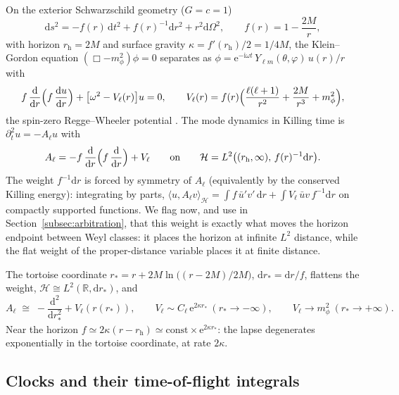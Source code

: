 \documentclass[11pt]{article}
\theoremstyle{definition}
\theoremstyle{remark}
\newcommand{\ii}{\mathrm{i}}
\newcommand{\ee}{\mathrm{e}}
\newcommand{\dd}{\mathrm{d}}
\newcommand{\rh}{r_{\mathrm{h}}}
\newcommand{\rstar}{r_{*}}
\begin{document}
On the exterior Schwarzschild geometry ($G=c=1$)
\begin{equation}
\dd s^{2}=-f(r)\,\dd t^{2}+f(r)^{-1}\dd r^{2}+r^{2}\dd\Omega^{2},
\qquad f(r)=1-\frac{2M}{r},
\end{equation}
with horizon $\rh=2M$ and surface gravity
$\kappa=f'(\rh)/2=1/4M$, the Klein--Gordon equation
$(\Box-m_{\phi}^{2})\phi=0$ separates as
$\phi=\ee^{-\ii\omega t}\,Y_{\ell m}(\theta,\varphi)\,u(r)/r$ with
\begin{equation}
f\,\frac{\dd}{\dd r}\Bigl(f\,\frac{\dd u}{\dd r}\Bigr)
+\bigl[\omega^{2}-V_{\ell}(r)\bigr]u=0,
\qquad
V_{\ell}(r)=f(r)\Bigl(\frac{\ell(\ell+1)}{r^{2}}
+\frac{2M}{r^{3}}+m_{\phi}^{2}\Bigr),
\label{eq:radial}
\end{equation}
the spin-zero Regge--Wheeler potential \cite{ReggeWheeler1957}. The
mode dynamics in Killing time is $\partial_{t}^{2}u=-A_{\ell}u$ with
\begin{equation}
A_{\ell}=-f\,\frac{\dd}{\dd r}\Bigl(f\,\frac{\dd}{\dd r}\Bigr)
+V_{\ell}
\qquad\text{on}\qquad
\mathcal{H}=L^{2}\bigl((\rh,\infty),\,f(r)^{-1}\dd r\bigr).
\label{eq:Aell}
\end{equation}
The weight $f^{-1}\dd r$ is forced by symmetry of $A_{\ell}$ (equivalently
by the conserved Killing energy): integrating by parts,
$\langle u,A_{\ell}v\rangle_{\mathcal H}
=\int f\,\bar u' v'\,\dd r+\int V_{\ell}\,\bar u v\,f^{-1}\dd r$
on compactly supported functions. We flag now, and use in
Section~\ref{subsec:arbitration}, that this weight is exactly what
moves the horizon endpoint between Weyl classes: it places the horizon
at infinite $L^{2}$ distance, while the flat weight of the
proper-distance variable places it at finite distance.

The tortoise coordinate $\rstar=r+2M\ln\bigl((r-2M)/2M\bigr)$,
$\dd\rstar=\dd r/f$, flattens the weight,
$\mathcal H\cong L^{2}(\mathbb{R},\dd\rstar)$, and
\begin{equation}
A_{\ell}\;\cong\;-\frac{\dd^{2}}{\dd\rstar^{2}}+V_{\ell}(r(\rstar)),
\qquad
V_{\ell}\sim C_{\ell}\,\ee^{2\kappa\rstar}\ (\rstar\to-\infty),
\qquad
V_{\ell}\to m_{\phi}^{2}\ (\rstar\to+\infty).
\label{eq:tortoiseop}
\end{equation}
Near the horizon $f\simeq 2\kappa(r-\rh)\simeq
\mathrm{const}\times\ee^{2\kappa\rstar}$: the lapse degenerates
exponentially in the tortoise coordinate, at rate $2\kappa$.

\subsection{Clocks and their time-of-flight integrals}
\label{subsec:clocks}
\end{document}
